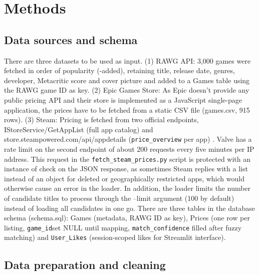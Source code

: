 \documentclass[fleqn,10pt]{wlscirep}
\begin{document}
\section*{Methods}

\subsection*{Data sources and schema}

There are three datasets to be used as input. (1) RAWG API\cite{RAWG:api}: 3,000 games were fetched in order of popularity (-added), retaining title, release date, genres, developer, Metacritic score and cover picture and added to a Games table using the RAWG game ID as key. (2) Epic Games Store: As Epic doesn't provide any public pricing API and their store is implemented as a JavaScript single-page application, the prices have to be fetched from a static CSV file (games.csv\cite{Kaggle:epicgamesstore}, 915 rows). (3) Steam: Pricing is fetched from two official endpoints, IStoreService/GetAppList (full app catalog) and store.steampowered.com/api/appdetails (\texttt{price\_overview} per app) \cite{Valve:webapi}. Valve has a rate limit on the second endpoint of about 200 requests every five minutes per IP address. This request in the \texttt{fetch\_steam\_prices.py} script is protected with an instance of check on the JSON response, as sometimes Steam replies with a list instead of an object for deleted or geographically restricted apps, which would otherwise cause an error in the loader. In addition, the loader limits the number of candidate titles to process through the --limit argument (100 by default) instead of loading all candidates in one go. There are three tables in the database schema (schema.sql): Games (metadata, RAWG ID as key), Prices (one row per listing, \texttt{game\_id}set NULL until mapping, \texttt{match\_confidence} filled after fuzzy matching) and \texttt{User\_Likes} (session-scoped likes for Streamlit interface).

\subsection*{Data preparation and cleaning}
\end{document}
